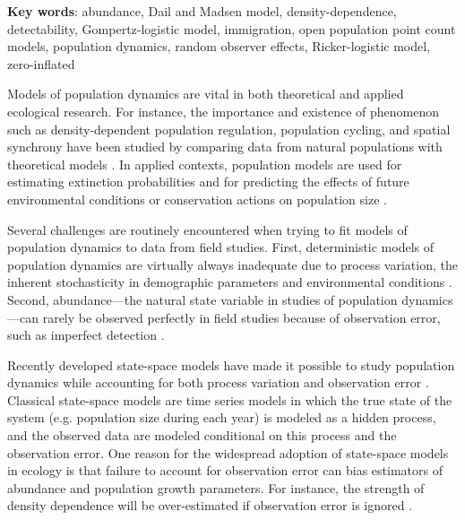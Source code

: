 \documentclass[12pt]{article}
\begin{document}

\textbf{Key words}: abundance, Dail and Madsen model, density-dependence,
detectability, Gompertz-logistic model, immigration, open population point 
count models, population dynamics, random observer effects, Ricker-logistic model, zero-inflated

\vspace{0.5cm}

Models of population dynamics are vital in both theoretical and
applied ecological research. For instance, %
the importance and existence of phenomenon such as
density-dependent population regulation, population cycling, and
spatial synchrony have been studied by comparing data from natural
populations with theoretical models
\citep{may:1975,turchin:1990,bjornstad_etal:1999,royama:1977}. %
In applied contexts, population models are used for estimating extinction probabilities
\citep{schoener_spiller:1992,nadeem_lele:2011,hostetler_etal:2012} and for predicting the
effects of future environmental conditions or conservation actions on
population size \citep{jamieson_brooks:2004,hatfield_etal:2012}.

Several challenges are routinely encountered when trying to fit models
of population dynamics to data from field studies. %
First, deterministic models of population dynamics are virtually always inadequate due to process
variation, the inherent stochasticity in demographic parameters and environmental
conditions \citep{bjornstad_grenfell:2001,saether_engen:2002}.
Second, abundance---the natural state variable in studies
of population dynamics---can rarely be observed perfectly in field
studies because of observation error, such as imperfect
detection \citep{link_nichols:1994,kery_etal:2009}.

Recently developed state-space models %
have made it possible to %
study population dynamics while accounting for both process variation
and observation error \citep{devalpine_hastings:2002,
  buckland_etal:2004, dennis_etal:2006}. Classical state-space
models are time series models in which the true state of the
system (e.g. population size during each year) is modeled as a hidden
process, and the observed data are modeled conditional on this process
and the observation error. One reason for the widespread adoption of
state-space models in ecology is that failure to account for 
observation error can bias estimators of abundance and
population growth parameters. For instance, the strength of
density dependence will be over-estimated if observation error is
ignored \citep{link_nichols:1994,shenk_etal:1998}.
\end{document}
